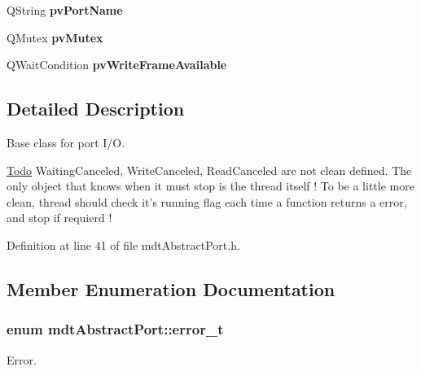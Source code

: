 \begin{DoxyCompactItemize}
\item 
\hypertarget{classmdt_abstract_port_afb8f8a723ff2db5141f18750020a7ee9}{
QString {\bfseries pvPortName}}
\label{classmdt_abstract_port_afb8f8a723ff2db5141f18750020a7ee9}

\item 
\hypertarget{classmdt_abstract_port_a357bce65bc031fffa87090a26ab88a08}{
QMutex {\bfseries pvMutex}}
\label{classmdt_abstract_port_a357bce65bc031fffa87090a26ab88a08}

\item 
\hypertarget{classmdt_abstract_port_a4c81c98680c98ad6802dccd30380459d}{
QWaitCondition {\bfseries pvWriteFrameAvailable}}
\label{classmdt_abstract_port_a4c81c98680c98ad6802dccd30380459d}

\end{DoxyCompactItemize}


\subsection{Detailed Description}
Base class for port I/O. 

\begin{Desc}
\item[\hyperlink{todo__todo000010}{Todo}]WaitingCanceled, WriteCanceled, ReadCanceled are not clean defined. The only object that knows when it must stop is the thread itself ! To be a little more clean, thread should check it's running flag each time a function returns a error, and stop if requierd ! \end{Desc}


Definition at line 41 of file mdtAbstractPort.h.



\subsection{Member Enumeration Documentation}
\hypertarget{classmdt_abstract_port_ad4121bb930c95887e77f8bafa065a85e}{
\subsubsection[{error\_\-t}]{\setlength{\rightskip}{0pt plus 5cm}enum {\bf mdtAbstractPort::error\_\-t}}}
\label{classmdt_abstract_port_ad4121bb930c95887e77f8bafa065a85e}


Error. 

